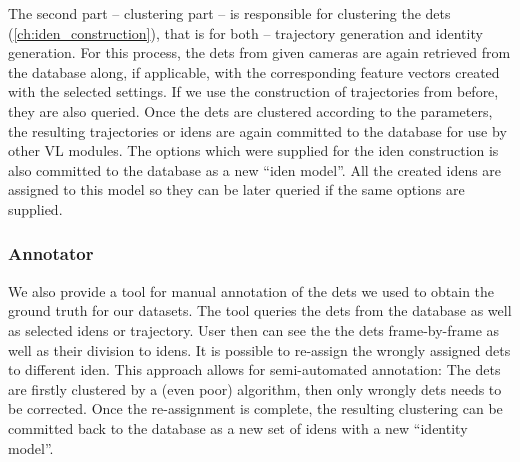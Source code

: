 The second part -- clustering part -- is responsible for clustering the \glspl{det} (\autoref{ch:iden_construction}), that is for both -- trajectory generation and identity generation. For this process, the \glspl{det} from given cameras are again retrieved from the database along, if applicable, with the corresponding feature vectors created with the selected settings. If we use the construction of trajectories from before, they are also queried. Once the \glspl{det} are clustered according to the parameters, the resulting trajectories or \glspl{iden} are again committed to the database for use by other \gls{VL} modules. The options which were supplied for the \gls{iden} construction is also committed to the database as a new ``\gls{iden} model''. All the created \glspl{iden} are assigned to this model so they can be later queried if the same options are supplied.

\subsubsection*{Annotator}
We also provide a tool for manual annotation of the \glspl{det} we used to obtain the ground truth for our datasets. The tool queries the \glspl{det} from the database as well as selected \glspl{iden} or trajectory. User then can see the the \glspl{det} frame-by-frame as well as their division to \glspl{iden}. It is possible to re-assign the wrongly assigned \glspl{det} to different \gls{iden}. This approach allows for semi-automated annotation: The \glspl{det} are firstly clustered by a (even poor) algorithm, then only wrongly \glspl{det} needs to be corrected. Once the re-assignment is complete, the resulting clustering can be committed back to the database as a new set of \glspl{iden} with a new ``identity model''.

